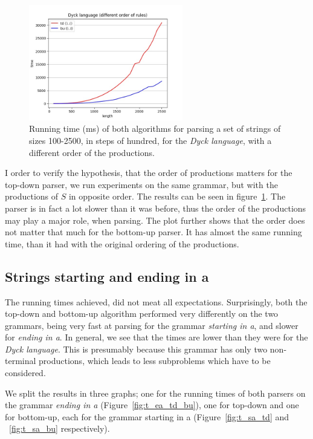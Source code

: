 \begin{figure}[h!]
    \centering
    \includegraphics[width=0.6\textwidth]{Resources/t_dyck_order.jpg}
    \caption{Running time (ms) of both algorithms for parsing a set of strings of sizes 100-2500, in steps of hundred, for the \textit{Dyck language}, with a different order of the productions.}
    \label{fig:t_dyck_order}
\end{figure}

I order to verify the hypothesis, that the order of productions matters for the top-down parser, we run experiments on the same grammar, but with the productions of $S$ in opposite order.
The results can be seen in figure~\ref{fig:t_dyck_order}.
The parser is in fact a lot slower than it was before, thus the order of the productions may play a major role, when parsing.
The plot further shows that the order does not matter that much for the bottom-up parser.
It has almost the same running time, than it had with the original ordering of the productions.

\subsection{Strings starting and ending in a}

The running times achieved, did not meat all expectations.
Surprisingly, both the top-down and bottom-up algorithm performed very differently on the two grammars, being very fast at parsing for the grammar \textit{starting in a}, and slower for \textit{ending in a}.
In general, we see that the times are lower than they were for the \textit{Dyck language}.
This is presumably because this grammar has only two non-terminal productions, which leads to less subproblems which have to be considered.

We split the results in three graphs; one for the running times of both parsers on the grammar \textit{ending in a} (Figure~\ref{fig:t_ea_td_bu}), one for top-down and one for bottom-up, each for the grammar starting in a (Figure~\ref{fig:t_sa_td} and ~\ref{fig:t_sa_bu} respectively).


